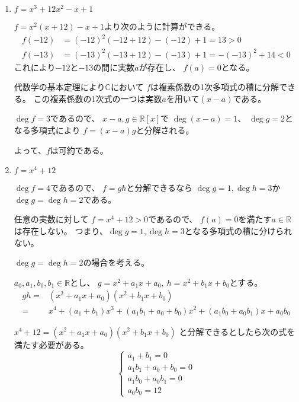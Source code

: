 \documentclass[12pt,b5paper]{ltjsarticle}
\begin{document}
\begin{enumerate}
       \hrulefill

 \item $f=x^3+12x^2-x+1$

       \dotfill


       $f=x^2(x+12)-x+1$より次のように計算ができる。
       \begin{align}
       f(-12)&=(-12)^2(-12+12)-(-12)+1=13>0\\
       f(-13)&=(-13)^2(-13+12)-(-13)+1=-(-13)^2+14<0
       \end{align}
       これにより$-12$と$-13$の間に実数$a$が存在し、
       $f(a)=0$となる。

       代数学の基本定理により$\mathbb{C}$において
       $f$は複素係数の1次多項式の積に分解できる。
       この複素係数の1次式の一つは実数$a$を用いて$(x-a)$である。


       $\deg{f}=3$であるので、
       $x-a,g\in\mathbb{R}[x]$で
       $\deg{(x-a)}=1$、
       $\deg{g}=2$となる多項式により
       $f=(x-a)g$と分解される。

       よって、$f$は可約である。

       \hrulefill

 \item $f=x^4+12$

       \dotfill

       $\deg{f}=4$であるので、
       $f=gh$と分解できるなら
       $\deg{g}=1,\deg{h}=3$か
       $\deg{g}=\deg{h}=2$である。

       任意の実数に対して
       $f=x^4+12>0$であるので、
       $f(a)=0$を満たす$a\in\mathbb{R}$は存在しない。
       つまり、$\deg{g}=1,\deg{h}=3$となる多項式の積に分けられない。

       $\deg{g}=\deg{h}=2$の場合を考える。

       $a_0,a_1,b_0,b_1\in\mathbb{R}$とし、
       $g=x^2+a_1x+a_0,\ h=x^2+b_1x+b_0$とする。
       \begin{align}
        gh =& (x^2+a_1x+a_0)(x^2+b_1x+b_0)\\
         =&
         x^{4}
         + {\left(a_{1} + b_{1}\right)} x^{3}
         + {\left(a_{1} b_{1} + a_{0} + b_{0}\right)} x^{2}
         + {\left(a_{1} b_{0} + a_{0} b_{1}\right)} x
         + a_{0} b_{0}
       \end{align}

       $x^4+12=(x^2+a_1x+a_0)(x^2+b_1x+b_0)$
       と分解できるとしたら次の式を満たす必要がある。
       \begin{equation}
        \begin{cases}
         a_{1} + b_{1}=0\\
         a_{1} b_{1} + a_{0} + b_{0}=0\\
         a_{1} b_{0} + a_{0} b_{1}=0\\
         a_{0} b_{0}=12
        \end{cases}
       \end{equation}


\end{enumerate}
\end{document}
